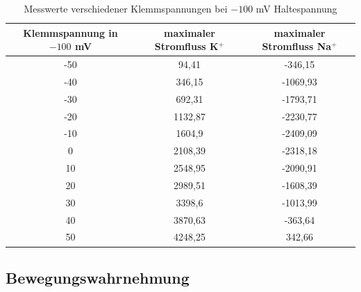 \documentclass[11pt]{article}
\begin{document}
\begin{table}[H]
\caption{Messwerte verschiedener Klemmspannungen bei $-100$ mV Haltespannung}
\centering
\begin{adjustbox}{width=1.3\textwidth, center=\textwidth}
\begin{tabular}{c|c|c}
Klemmspannung in $-100$ mV & maximaler Stromfluss K$^+$ & maximaler Stromfluss Na$^+$\\
\hline\hline
-50	&	94,41	&	-346,15	\\
-40	&	346,15	&	-1069,93	\\
-30	&	692,31	&	-1793,71	\\
-20	&	1132,87	&	-2230,77	\\
-10	&	1604,9	&	-2409,09	\\
0	&	2108,39	&	-2318,18	\\
10	&	2548,95	&	-2090,91	\\
20	&	2989,51	&	-1608,39	\\
30	&	3398,6	&	-1013,99	\\
40	&	3870,63	&	-363,64	\\
50	&	4248,25	&	342,66	
\end{tabular}
\end{adjustbox}
\label{werte32}
\end{table}

\subsection{Bewegungswahrnehmung}
\end{document}

